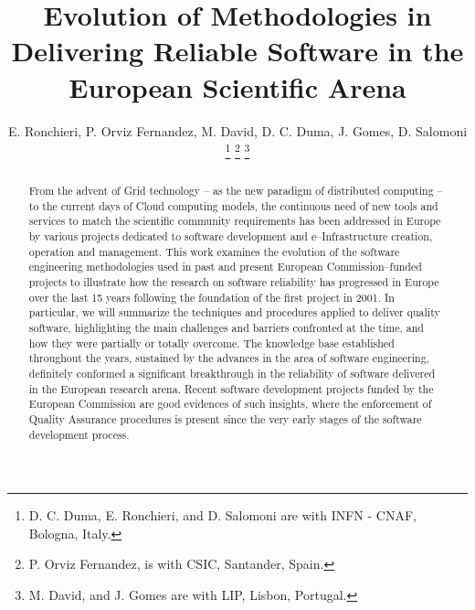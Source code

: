 \documentclass[journal]{IEEEtran}
\begin{document}
\title{Evolution of Methodologies in Delivering Reliable Software in the European Scientific Arena}

\author{E. Ronchieri,
        P. Orviz Fernandez,
        M. David,
	D. C. Duma,
        J. Gomes,
        D. Salomoni
\thanks{D. C. Duma, E. Ronchieri, and D. Salomoni are with INFN - CNAF, Bologna, Italy.}
\thanks{P. Orviz Fernandez, is with CSIC, Santander, Spain.}
\thanks{M. David, and J. Gomes are with LIP, Lisbon, Portugal.}%
}


\maketitle

\begin{abstract}
From the advent of Grid technology -- as the new paradigm of distributed
computing -- to the current days of Cloud computing models, the continuous need
of new tools and services to match the scientific community requirements has been
addressed in Europe by various projects dedicated to software development
and e--Infrastructure creation, operation and management.
This work examines the evolution of the software engineering methodologies used in past and
present European Commission--funded projects to illustrate how the research on software
reliability has progressed in Europe over the last 15 years following the foundation of the
first project in 2001. In particular, we will summarize the techniques and procedures
applied to deliver quality software, highlighting the main challenges and barriers confronted
at the time, and how they were partially or totally overcome. The knowledge base established
throughout the years, sustained by the advances in the area of software engineering,
definitely conformed a significant breakthrough in the reliability of software delivered in the
European research arena. Recent software development projects funded by the European
Commission are good evidences of such insights, where the enforcement of Quality Assurance
procedures is present since the very early stages of the software development process.
\end{abstract}
\end{document}
